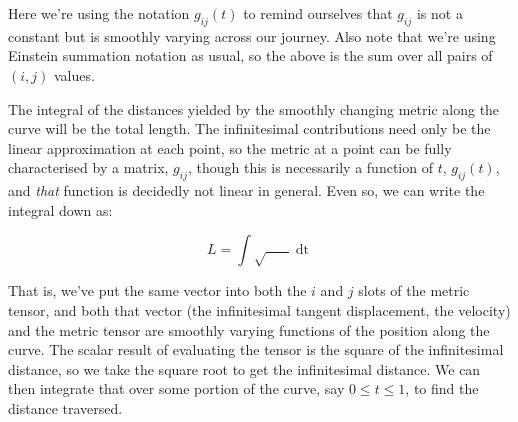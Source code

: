 Here we're using the notation $g_{ij}(t)$ to remind ourselves that $g_{ij}$ is not a constant but is smoothly varying across our journey. Also note that we're using Einstein summation notation as usual, so the above is the sum over all pairs of $(i, j)$ values.

The integral of the distances yielded by the smoothly changing metric along the curve will be the total length. The infinitesimal contributions need only be the linear approximation at each point, so the metric at a point can be fully characterised by a matrix, $g_{ij}$, though this is necessarily a function of $t$, $g_{ij}(t)$, and \textit{that} function is decidedly not linear in general. Even so, we can write the integral down as:

$$
L =
\int
\sqrt{
    \mathop{g_{ij}(t)}
    \mathop{v^i(t)}
    \mathop{v^j(t)}
}
\mathop{dt}
$$

That is, we've put the same vector into both the $i$ and $j$ slots of the metric tensor, and both that vector (the infinitesimal tangent displacement, the velocity) and the metric tensor are smoothly varying functions of the position along the curve. The scalar result of evaluating the tensor is the square of the infinitesimal distance, so we take the square root to get the infinitesimal distance. We can then integrate that over some portion of the curve, say $0 \le t \le 1$, to find the distance traversed.

